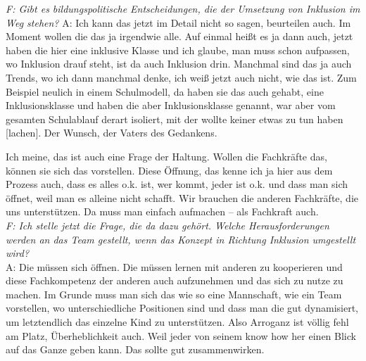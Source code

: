 \begin{linenumbers*}
\emph{F: Gibt es bildungspolitische Entscheidungen, die der Umsetzung von Inklusion im Weg stehen?} 
A: Ich kann das jetzt im Detail nicht so sagen, beurteilen auch. Im Moment wollen die das ja irgendwie alle. Auf einmal heißt es ja dann auch, jetzt haben die hier eine inklusive Klasse und ich glaube, man muss schon aufpassen, wo Inklusion drauf steht, ist da auch Inklusion drin. Manchmal sind das ja auch Trends, wo ich dann manchmal denke, ich weiß jetzt auch nicht, wie das ist. Zum Beispiel neulich in einem Schulmodell, da haben sie das auch gehabt, eine Inklusionsklasse und haben die aber Inklusionsklasse genannt, war aber vom gesamten Schulablauf derart isoliert, mit der wollte keiner etwas zu tun haben [lachen]. Der Wunsch, der Vaters des Gedankens. 

Ich meine, das ist auch eine Frage der Haltung. Wollen die Fachkräfte das, können sie sich das vorstellen. Diese Öffnung, das kenne ich ja hier aus dem Prozess auch, dass es alles o.k. ist, wer kommt, jeder ist o.k. und dass man sich öffnet, weil man es alleine nicht schafft. Wir brauchen die anderen Fachkräfte, die uns unterstützen. Da muss man einfach aufmachen -- als Fachkraft auch.\\
\emph{F: Ich stelle jetzt die Frage, die da dazu gehört. Welche Herausforderungen werden an das Team gestellt, wenn das Konzept in Richtung Inklusion umgestellt wird?}\\
A: Die müssen sich öffnen. Die müssen lernen mit anderen zu kooperieren und diese Fachkompetenz der anderen auch aufzunehmen und das sich zu nutze zu machen. Im Grunde muss man sich das wie so eine Mannschaft, wie ein Team vorstellen, wo unterschiedliche Positionen sind und dass man die gut dynamisiert, um letztendlich das einzelne Kind zu unterstützen. Also Arroganz ist völlig fehl am Platz, Überheblichkeit auch. Weil jeder von seinem know how her einen Blick auf das Ganze geben kann. Das sollte gut zusammenwirken.


\end{linenumbers*}
